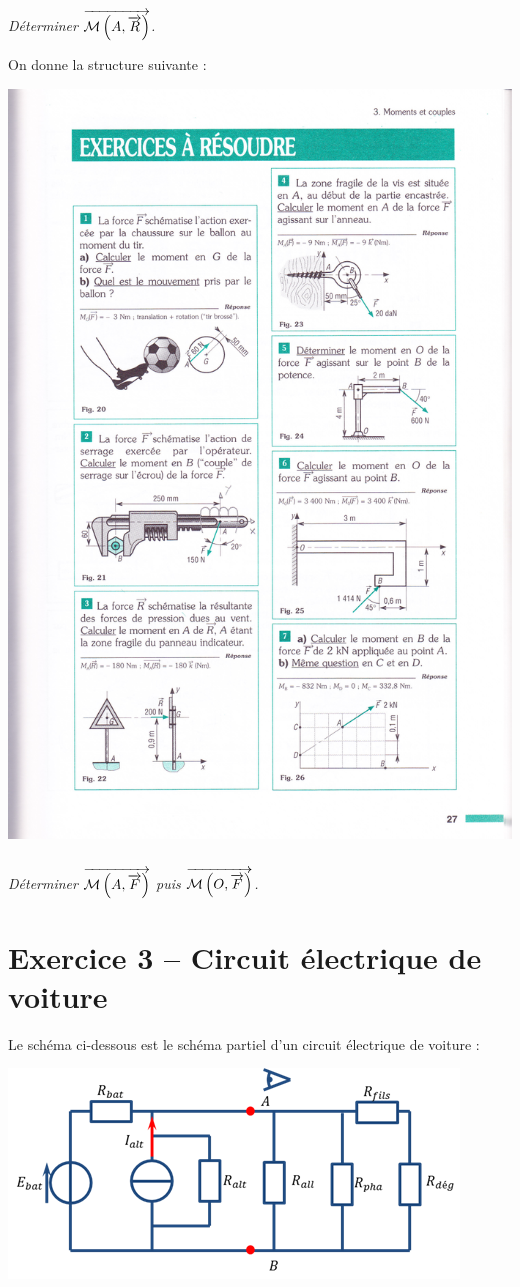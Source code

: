 \documentclass[10pt,fleqn]{book} %
\begin{document}
\begin{multicols}{2}
\subparagraph{}
\textit{Déterminer $\overrightarrow{\mathcal{M}\left(A,\overrightarrow{R} \right)}$.}

On donne la structure suivante : 
\begin{center}
\includegraphics[width=.6\linewidth]{images/fig_03}
\end{center}


\subparagraph{}
\textit{Déterminer $\overrightarrow{\mathcal{M}\left(A,\overrightarrow{F} \right)}$ puis $\overrightarrow{\mathcal{M}\left(O,\overrightarrow{F} \right)}$.}




\section*{Exercice 3 -- Circuit électrique de voiture}
\setcounter{subparagraph}{0}
Le schéma ci-dessous est le schéma partiel d'un circuit électrique de voiture :
\begin{center}
\includegraphics[width=.8\linewidth]{images/fig_04}
\end{center}


\end{multicols}
\end{document}
